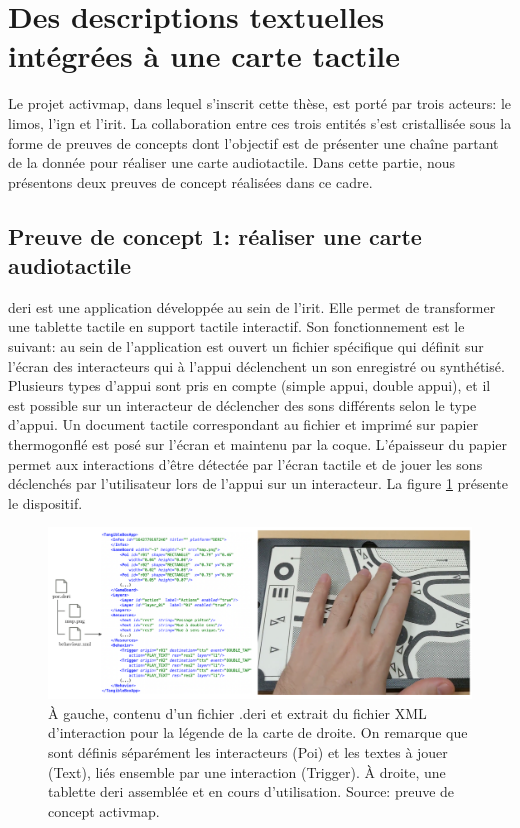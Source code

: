 \section{Des descriptions textuelles intégrées à une carte tactile}

Le projet \gls{activmap}, dans lequel s'inscrit cette thèse, est porté par trois acteurs: le \gls{limos}, l'\gls{ign} et l'\gls{irit}. La collaboration entre ces trois entités s'est cristallisée sous la forme de preuves de concepts dont l'objectif est de présenter une chaîne partant de la donnée pour réaliser une carte audiotactile. Dans cette partie, nous présentons deux preuves de concept réalisées dans ce cadre.

\subsection{Preuve de concept 1: réaliser une carte audiotactile}

\label{sec:experimentation_poc1}

\gls{deri} \citep{Brock2012} est une application développée au sein de l'\gls{irit}. Elle permet de transformer une tablette tactile en support tactile interactif. Son fonctionnement est le suivant: au sein de l'application est ouvert un fichier spécifique qui définit sur l'écran des interacteurs qui à l'appui déclenchent un son enregistré ou synthétisé. Plusieurs types d'appui sont pris en compte (simple appui, double appui), et il est possible sur un interacteur de déclencher des sons différents selon le type d'appui. Un document tactile correspondant au fichier et imprimé sur papier thermogonflé est posé sur l'écran et maintenu par la coque. L'épaisseur du papier permet aux interactions d'être détectée par l'écran tactile et de jouer les sons déclenchés par l'utilisateur lors de l'appui sur un interacteur. La figure \ref{fig:experimentation_exemple_deri} présente le dispositif.

\begin{figure}[ht]
    \centering
    \includegraphics[width=\textwidth]{images/experimentation/exemple_deri.pdf}
    \caption[Exemple de fichier DERi]{À gauche, contenu d'un fichier .deri et extrait du fichier XML d'interaction pour la légende de la carte de droite. On remarque que sont définis séparément les interacteurs (Poi) et les textes à jouer (Text), liés ensemble par une interaction (Trigger). À droite, une tablette \gls{deri} assemblée et en cours d'utilisation. Source: preuve de concept \gls{activmap}.}
    \label{fig:experimentation_exemple_deri}
\end{figure}

